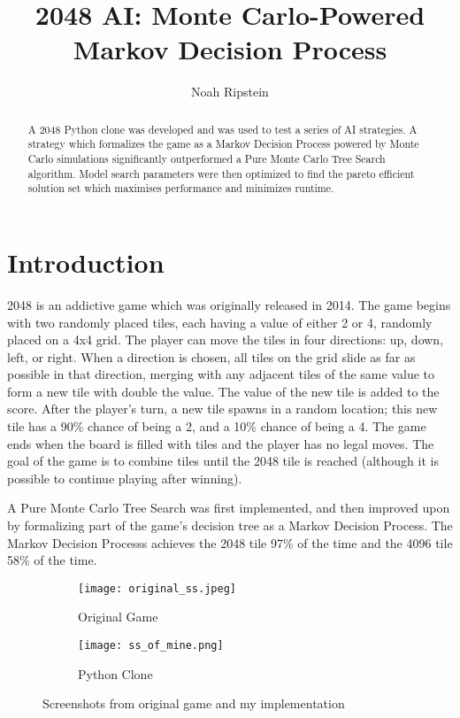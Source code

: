 \documentclass{article}
\title{2048 AI: Monte Carlo-Powered Markov Decision Process}
\author{Noah Ripstein}
\date{}
\begin{document}
\usetikzlibrary{decorations.pathreplacing} %
\maketitle


\begin{abstract}
A 2048 Python clone was developed and was used to test a series of AI strategies.  A strategy which formalizes the game as a Markov Decision Process powered by Monte Carlo simulations significantly outperformed a Pure Monte Carlo Tree Search algorithm.  Model search parameters were then optimized to find the pareto efficient solution set which maximises performance and minimizes runtime.
\end{abstract}

\section{Introduction}

2048 is an addictive game which was originally released in 2014.  The game begins with two randomly placed tiles, each having a value of either 2 or 4, randomly placed on a 4x4 grid. The player can move the tiles in four directions: up, down, left, or right. When a direction is chosen, all tiles on the grid slide as far as possible in that direction, merging with any adjacent tiles of the same value to form a new tile with double the value.  The value of the new tile is added to the score. After the player's turn,  a new tile spawns in a random location; this new tile has a 90\% chance of being a 2, and a 10\% chance of being a 4.   The game ends when the board is filled with tiles and the player has no legal moves.  The goal of the game is to combine tiles until the 2048 tile is reached (although it is possible to continue playing after winning).

A Pure Monte Carlo Tree Search was first implemented, and then improved upon by formalizing part of the game's decision tree as a Markov Decision Process.  The Markov Decision Processs achieves the 2048 tile 97\% of the time and the 4096 tile 58\% of the time. 



\begin{figure}[htbp]
  \centering
  \begin{subfigure}[b]{0.45\textwidth}
    \texttt{[image: original\_ss.jpeg]}
    \caption{Original Game}
    \label{fig:original_ss}
  \end{subfigure}
  \hfill
  \begin{subfigure}[b]{0.45\textwidth}
    \texttt{[image: ss\_of\_mine.png]}
    \caption{Python Clone}
    \label{fig:ss_of_mine}
  \end{subfigure}
  \caption{Screenshots from original game and my implementation}
  \label{fig:screenshots}
\end{figure}
\end{document}
